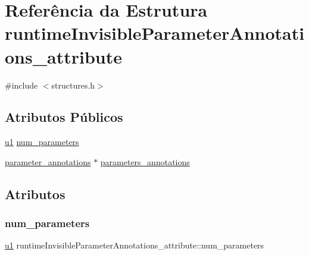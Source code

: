 \hypertarget{structruntimeInvisibleParameterAnnotations__attribute}{}\section{Referência da Estrutura runtime\+Invisible\+Parameter\+Annotations\+\_\+attribute}
\label{structruntimeInvisibleParameterAnnotations__attribute}


{\ttfamily \#include $<$structures.\+h$>$}

\subsection*{Atributos Públicos}
\begin{DoxyCompactItemize}
\item 
\hyperlink{lista__operandos_8h_ad9f4cdb6757615aae2fad89dab3c5470}{u1} \hyperlink{structruntimeInvisibleParameterAnnotations__attribute_a9cd7cc3ab3d3b8992aacd54480384375}{num\+\_\+parameters}
\item 
\hyperlink{structparameter__annotations}{parameter\+\_\+annotations} $\ast$ \hyperlink{structruntimeInvisibleParameterAnnotations__attribute_a5e720df1952e818a4b5973aec115eade}{parameters\+\_\+annotations}
\end{DoxyCompactItemize}


\subsection{Atributos}
\mbox{\label{structruntimeInvisibleParameterAnnotations__attribute_a9cd7cc3ab3d3b8992aacd54480384375}} 
\subsubsection{\texorpdfstring{num\+\_\+parameters}{num\_parameters}}
{\footnotesize\ttfamily \hyperlink{lista__operandos_8h_ad9f4cdb6757615aae2fad89dab3c5470}{u1} runtime\+Invisible\+Parameter\+Annotations\+\_\+attribute\+::num\+\_\+parameters}

